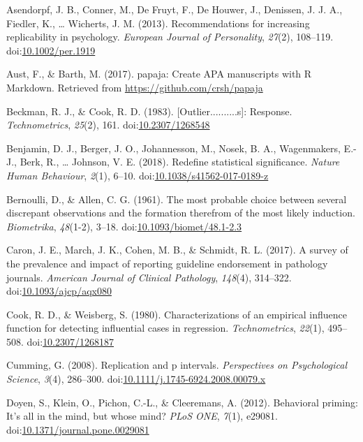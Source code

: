 \documentclass[english,,man,mask]{apa6}
\theoremstyle{definition}
\theoremstyle{definition}
\theoremstyle{definition}
\theoremstyle{remark}
\begin{document}
\hypertarget{refs}{}
\hypertarget{ref-Asendorpf2012}{}
Asendorpf, J. B., Conner, M., De Fruyt, F., De Houwer, J., Denissen, J.
J. A., Fiedler, K., \ldots{} Wicherts, J. M. (2013). Recommendations for
increasing replicability in psychology. \emph{European Journal of
Personality}, \emph{27}(2), 108--119.
doi:\href{https://doi.org/10.1002/per.1919}{10.1002/per.1919}

\hypertarget{ref-Aust2017}{}
Aust, F., \& Barth, M. (2017). papaja: Create APA manuscripts with R
Markdown. Retrieved from \url{https://github.com/crsh/papaja}

\hypertarget{ref-Beckman1983}{}
Beckman, R. J., \& Cook, R. D. (1983). {[}Outlier..........s{]}:
Response. \emph{Technometrics}, \emph{25}(2), 161.
doi:\href{https://doi.org/10.2307/1268548}{10.2307/1268548}

\hypertarget{ref-Benjamin2018}{}
Benjamin, D. J., Berger, J. O., Johannesson, M., Nosek, B. A.,
Wagenmakers, E.-J., Berk, R., \ldots{} Johnson, V. E. (2018). Redefine
statistical significance. \emph{Nature Human Behaviour}, \emph{2}(1),
6--10.
doi:\href{https://doi.org/10.1038/s41562-017-0189-z}{10.1038/s41562-017-0189-z}

\hypertarget{ref-Bernoulli1777}{}
Bernoulli, D., \& Allen, C. G. (1961). The most probable choice between
several discrepant observations and the formation therefrom of the most
likely induction. \emph{Biometrika}, \emph{48}(1-2), 3--18.
doi:\href{https://doi.org/10.1093/biomet/48.1-2.3}{10.1093/biomet/48.1-2.3}

\hypertarget{ref-Caron2017}{}
Caron, J. E., March, J. K., Cohen, M. B., \& Schmidt, R. L. (2017). A
survey of the prevalence and impact of reporting guideline endorsement
in pathology journals. \emph{American Journal of Clinical Pathology},
\emph{148}(4), 314--322.
doi:\href{https://doi.org/10.1093/ajcp/aqx080}{10.1093/ajcp/aqx080}

\hypertarget{ref-Cook1980}{}
Cook, R. D., \& Weisberg, S. (1980). Characterizations of an empirical
influence function for detecting influential cases in regression.
\emph{Technometrics}, \emph{22}(1), 495--508.
doi:\href{https://doi.org/10.2307/1268187}{10.2307/1268187}

\hypertarget{ref-Cumming2008}{}
Cumming, G. (2008). Replication and p intervals. \emph{Perspectives on
Psychological Science}, \emph{3}(4), 286--300.
doi:\href{https://doi.org/10.1111/j.1745-6924.2008.00079.x}{10.1111/j.1745-6924.2008.00079.x}

\hypertarget{ref-Doyen2012}{}
Doyen, S., Klein, O., Pichon, C.-L., \& Cleeremans, A. (2012).
Behavioral priming: It's all in the mind, but whose mind? \emph{PLoS
ONE}, \emph{7}(1), e29081.
doi:\href{https://doi.org/10.1371/journal.pone.0029081}{10.1371/journal.pone.0029081}
\end{document}
